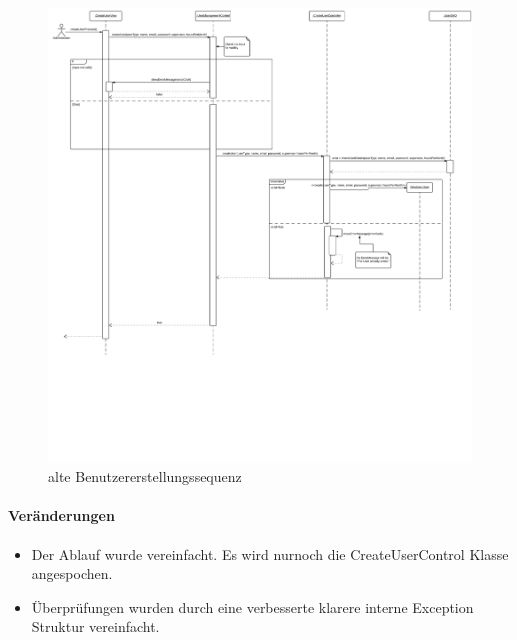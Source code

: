 \begin{figure}
  \centering
    \includegraphics[width=\linewidth]{Create-user-account.svg}
   \caption{alte Benutzererstellungssequenz}
\end{figure}

\paragraph{Veränderungen}
\begin{itemize}
    \item Der Ablauf wurde vereinfacht. Es wird nurnoch die CreateUserControl Klasse angespochen.
    \item Überprüfungen wurden durch eine verbesserte klarere interne Exception Struktur vereinfacht.
\end{itemize}

